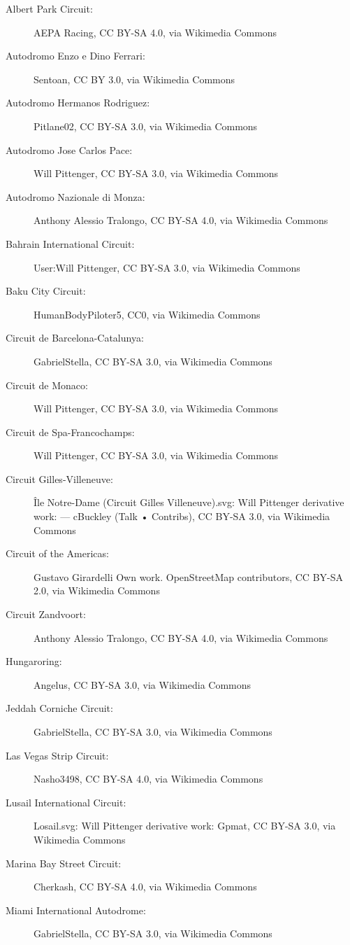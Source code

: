 \documentclass[11pt,a4paper]{article}
\begin{document}
\begin{description}
    \item[Albert Park Circuit:] AEPA Racing, CC BY-SA 4.0, via Wikimedia Commons 
    \item[Autodromo Enzo e Dino Ferrari:] Sentoan, CC BY 3.0, via Wikimedia Commons
    \item[Autodromo Hermanos Rodriguez:] Pitlane02, CC BY-SA 3.0, via Wikimedia Commons
    \item[Autodromo Jose Carlos Pace:] Will Pittenger, CC BY-SA 3.0, via Wikimedia Commons
    \item[Autodromo Nazionale di Monza:] Anthony Alessio Tralongo, CC BY-SA 4.0, via Wikimedia Commons
    \item[Bahrain International Circuit:] User:Will Pittenger, CC BY-SA 3.0, via Wikimedia Commons
    \item[Baku City Circuit:] HumanBodyPiloter5, CC0, via Wikimedia Commons
    \item[Circuit de Barcelona-Catalunya:] GabrielStella, CC BY-SA 3.0, via Wikimedia Commons
    \item[Circuit de Monaco:] Will Pittenger, CC BY-SA 3.0, via Wikimedia Commons
    \item[Circuit de Spa-Francochamps:] Will Pittenger, CC BY-SA 3.0, via Wikimedia Commons
    \item[Circuit Gilles-Villeneuve:] Île Notre-Dame (Circuit Gilles Villeneuve).svg: Will Pittenger derivative work: — cBuckley (Talk • Contribs), CC BY-SA 3.0, via Wikimedia Commons
    \item[Circuit of the Americas:] Gustavo Girardelli Own work. OpenStreetMap contributors, CC BY-SA 2.0, via Wikimedia Commons
    \item[Circuit Zandvoort:] Anthony Alessio Tralongo, CC BY-SA 4.0, via Wikimedia Commons
    \item[Hungaroring:] Angelus, CC BY-SA 3.0, via Wikimedia Commons
    \item[Jeddah Corniche Circuit:] GabrielStella, CC BY-SA 3.0, via Wikimedia Commons
    \item[Las Vegas Strip Circuit:] Nasho3498, CC BY-SA 4.0, via Wikimedia Commons
    \item[Lusail International Circuit:] Losail.svg: Will Pittenger derivative work: Gpmat, CC BY-SA 3.0, via Wikimedia Commons
    \item[Marina Bay Street Circuit:] Cherkash, CC BY-SA 4.0, via Wikimedia Commons
    \item[Miami International Autodrome:] GabrielStella, CC BY-SA 3.0, via Wikimedia Commons

\end{description}
\end{document}
